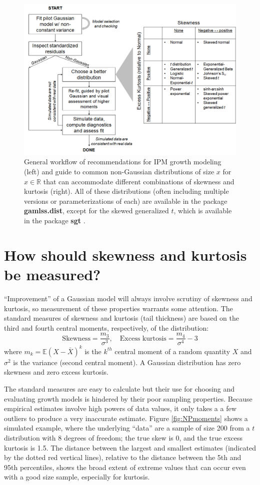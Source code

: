 \documentclass[12pt]{article}
\newcounter{box}
\newcommand{\be}{\begin{equation}}
\newcommand{\ee}{\end{equation}}
\begin{document}
\begin{figure}
\centering
\includegraphics[width=\textwidth]{figures/workflow}
\caption{General workflow of recommendations for IPM growth modeling (left) and guide to common non-Gaussian distributions of size $x$ for $x \in \mathbb{R}$ that can accommodate different combinations of skewness and kurtosis (right). 
All of these distributions (often including multiple versions or parameterizations of each) are available in the package \textbf{gamlss.dist}, 
except for the skewed generalized $t$, which is available in the package \textbf{sgt} \citep{davis-2015}.}
\label{fig:workflow}
\end{figure} 

\section*{How should skewness and kurtosis be measured?}
``Improvement'' of a Gaussian model will always involve scrutiny of skewness and kurtosis, so measurement of these properties warrants some attention. 
The standard measures of skewness and kurtosis (tail thickness) are based on the third and fourth central moments, respectively, of the distribution: 
\be
\mbox{Skewness} = \frac{m_3}{\sigma^3}, \quad \mbox{Excess kurtosis} = \frac{m_4}{\sigma^4}-3
\ee
where $m_k = \mathbb{E}(X - \bar{X})^k$ is the $k^{th}$ central moment of a random quantity $X$ 
and $\sigma^2$ is the variance (second central moment). 
A Gaussian distribution has zero skewness and zero excess kurtosis. 

The standard measures are easy to calculate but their use for choosing and evaluating growth models is hindered by their poor sampling properties. 
Because empirical estimates involve high powers of data values, it only takes a 
a few outliers to produce a very inaccurate estimate. 
Figure \ref{fig:NPmoments} shows a simulated example, where the underlying ``data'' are a sample of size 200 from a $t$ distribution with 8 degrees of freedom; the true skew is 0, and the true excess kurtosis is 1.5. 
The distance between the largest and smallest estimates (indicated by the dotted red vertical lines), relative to the distance between the 5th and 95th percentiles, shows the broad extent of extreme values that can occur even with a good size sample, especially for kurtosis. 
\end{document}
